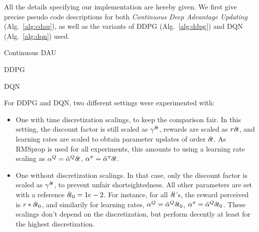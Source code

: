 All the details specifying our implementation are hereby given. We first give precise pseudo code
descriptions for both \emph{Continuous Deep Advantage Updating} (Alg.~\ref{alg:cdau}), as well as the variants of DDPG (Alg.~\ref{alg:ddpg})
and DQN (Alg.~\ref{alg:dqn}) used.

\begin{algorithm}
	
	\caption{Continuous DAU}
	\label{alg:cdau}
\end{algorithm}
\begin{algorithm}
	
	\caption{DDPG}
	\label{alg:ddpg}
\end{algorithm}
\begin{algorithm}
	
	\caption{DQN}
	\label{alg:dqn}
\end{algorithm}

For DDPG and DQN, two different settings were experimented with:
\begin{itemize}
	\item One with time discretization scalings, to keep the comparison
		fair. In this setting, the discount factor is still scaled as $\gamma^{\delta\hspace{-.1em}t}$,
		rewards are scaled as $r {\delta\hspace{-.1em}t}$, and learning rates are scaled to obtain parameter
		updates of order ${\delta\hspace{-.1em}t}$. As RMSprop is used for all experiments, this amounts
		to using a learning rate scaling as $\alpha^Q = \tilde{\alpha}^Q {\delta\hspace{-.1em}t}$,
		$\alpha^\pi = \tilde{\alpha}^\pi {\delta\hspace{-.1em}t}$.
	\item One without discretization scalings. In that case, only the discount factor is scaled
		as $\gamma^{\delta\hspace{-.1em}t}$, to prevent unfair shortsightedness. All other
		parameters are set with a reference ${\delta\hspace{-.1em}t}_0 = 1e-2$. For instance,
		for all ${\delta\hspace{-.1em}t}$'s, the reward perceived is $r * {\delta\hspace{-.1em}t}_0$, and
		similarily for learning rates, $\alpha^Q = \tilde{\alpha}^Q
		{\delta\hspace{-.1em}t}_0$, $\alpha^\pi = \tilde{\alpha}^Q {\delta\hspace{-.1em}t}_0$. These scalings
		don't depend on the discretization, but perform decently at least for
		the highest discretization.
\end{itemize}
